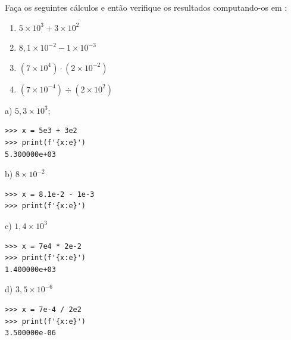 \begin{exer}
  Faça os seguintes cálculos e então verifique os resultados computando-os em {\python}:
  \begin{enumerate}
  \item $5\times 10^{3} + 3\times 10^{2}$
  \item $8,1\times 10^{-2} - 1\times 10^{-3}$
  \item $\left(7\times 10^4\right)\cdot (2\times 10^{-2})$
  \item $\left(7\times 10^{-4}\right)\div (2\times 10^{2})$
  \end{enumerate}
\end{exer}
\begin{resp}
  a) $5,3\times 10^3$;

\begin{lstlisting}
>>> x = 5e3 + 3e2
>>> print(f'{x:e}')
5.300000e+03
\end{lstlisting}
  
  b) $8\times 10^{-2}$

\begin{lstlisting}
>>> x = 8.1e-2 - 1e-3
>>> print(f'{x:e}')

\end{lstlisting}

  c) $1,4\times 10^{3}$

\begin{lstlisting}
>>> x = 7e4 * 2e-2
>>> print(f'{x:e}')
1.400000e+03
\end{lstlisting}

  d) $3,5\times 10^{-6}$

\begin{lstlisting}
>>> x = 7e-4 / 2e2
>>> print(f'{x:e}')
3.500000e-06
\end{lstlisting}

\end{resp}


